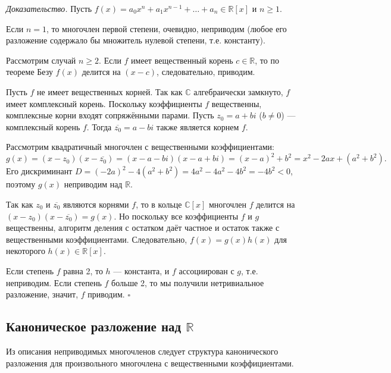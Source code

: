 \documentclass[a4paper,12pt]{article}
\theoremstyle{definition}
\theoremstyle{plain}
\theoremstyle{remark}
\begin{document}
	\medskip
	\textit{Доказательство.}
	Пусть \(f(x) = a_0x^n + a_1x^{n-1} + \dots + a_n \in \mathbb{R}[x]\) и \(n \geq 1\).
	
	Если \(n = 1\), то многочлен первой степени, очевидно, неприводим (любое его разложение содержало бы множитель нулевой степени, т.е. константу).
	
	Рассмотрим случай \(n \geq 2\). Если \(f\) имеет вещественный корень \(c \in \mathbb{R}\), то по теореме Безу \(f(x)\) делится на \((x - c)\), следовательно, приводим.
	
	Пусть \(f\) не имеет вещественных корней. Так как \(\mathbb{C}\) алгебраически замкнуто, \(f\) имеет комплексный корень. Поскольку коэффициенты \(f\) вещественны, комплексные корни входят сопряжёнными парами. Пусть \(z_0 = a + bi\) (\(b \neq 0\)) — комплексный корень \(f\). Тогда \(\overline{z_0} = a - bi\) также является корнем \(f\).
	
	Рассмотрим квадратичный многочлен с вещественными коэффициентами:
	\[
	g(x) = (x - z_0)(x - \overline{z_0}) = (x - a - bi)(x - a + bi) = (x - a)^2 + b^2 = x^2 - 2ax + (a^2 + b^2).
	\]
	Его дискриминант \(D = (-2a)^2 - 4(a^2 + b^2) = 4a^2 - 4a^2 - 4b^2 = -4b^2 < 0\), поэтому \(g(x)\) неприводим над \(\mathbb{R}\).
	
	Так как \(z_0\) и \(\overline{z_0}\) являются корнями \(f\), то в кольце \(\mathbb{C}[x]\) многочлен \(f\) делится на \((x - z_0)(x - \overline{z_0}) = g(x)\). Но поскольку все коэффициенты \(f\) и \(g\) вещественны, алгоритм деления с остатком даёт частное и остаток также с вещественными коэффициентами. Следовательно, \(f(x) = g(x) h(x)\) для некоторого \(h(x) \in \mathbb{R}[x]\).
	
	Если степень \(f\) равна 2, то \(h\) — константа, и \(f\) ассоциирован с \(g\), т.е. неприводим. Если степень \(f\) больше 2, то мы получили нетривиальное разложение, значит, \(f\) приводим. \hfill \(\square\)
	
	\subsection{Каноническое разложение над \(\mathbb{R}\)}
	
	Из описания неприводимых многочленов следует структура канонического разложения для произвольного многочлена с вещественными коэффициентами.
	
\end{document}
